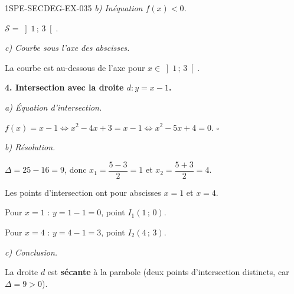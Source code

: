 \begin{corrige}{1SPE-SECDEG-EX-035}
\textit{b) Inéquation $f(x) < 0$.}

$\mathcal{S} = \left]1\,;\,3\right[$.

\textit{c) Courbe sous l'axe des abscisses.}

La courbe est au-dessous de l'axe pour $x \in \left]1\,;\,3\right[$.

\medskip
\textbf{4. Intersection avec la droite $d : y = x - 1$.}

\textit{a) Équation d'intersection.}


$f(x) = x - 1 \iff x^2 - 4x + 3 = x - 1 \iff x^2 - 5x + 4 = 0$. \hfill $\square$

\textit{b) Résolution.}

$\Delta = 25 - 16 = 9$, donc $x_1 = \dfrac{5-3}{2} = 1$ et $x_2 = \dfrac{5+3}{2} = 4$.

Les points d'intersection ont pour abscisses $x = 1$ et $x = 4$.

Pour $x = 1$ : $y = 1 - 1 = 0$, point $I_1(1\,;\,0)$.

Pour $x = 4$ : $y = 4 - 1 = 3$, point $I_2(4\,;\,3)$.

\textit{c) Conclusion.}

La droite $d$ est \textbf{sécante} à la parabole (deux points d'intersection distincts, car $\Delta = 9 > 0$).

\end{corrige}
